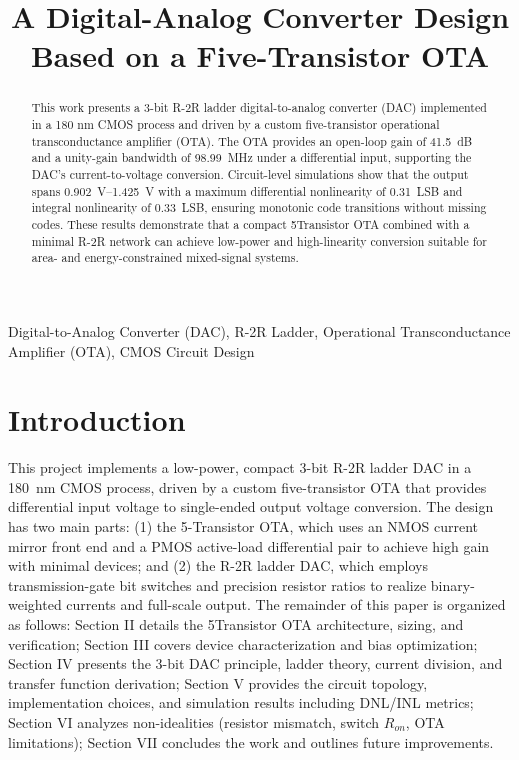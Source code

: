 \documentclass[conference]{IEEEtran}
\begin{document}
\title{A Digital-Analog Converter Design Based on a Five-Transistor OTA\\
}

\author{

}

\maketitle

\begin{abstract}
This work presents a 3-bit R-2R ladder digital-to-analog converter (DAC) implemented in a 180 nm CMOS process and driven by a custom five-transistor operational transconductance amplifier (OTA). 
The OTA provides an open-loop gain of \SI{41.5}{\deci\bel} and a unity-gain bandwidth of \SI{98.99}{\mega\hertz} under a differential input, supporting the DAC's current-to-voltage conversion. 
Circuit-level simulations show that the output spans \SIrange{0.902}{1.425}{\volt} with a maximum differential nonlinearity of \SI{0.31}{LSB} and integral nonlinearity of \SI{0.33}{LSB}, ensuring monotonic code transitions without missing codes. 
These results demonstrate that a compact 5Transistor OTA combined with a minimal R-2R network can achieve low-power and high-linearity conversion suitable for area- and energy-constrained mixed-signal systems.
\end{abstract}

\begin{IEEEkeywords}
Digital-to-Analog Converter (DAC), R-2R Ladder, Operational Transconductance Amplifier (OTA), CMOS Circuit Design
\end{IEEEkeywords}

\section{Introduction}
This project implements a low-power, compact 3-bit R-2R ladder DAC in a \SI{180}{\nano\meter} CMOS process, driven by a custom five-transistor OTA that provides differential input voltage to single-ended output voltage conversion. 
The design has two main parts: (1) the 5-Transistor OTA, which uses an NMOS current mirror front end and a PMOS active-load differential pair to achieve high gain with minimal devices; and (2) the R-2R ladder DAC, which employs transmission-gate bit switches and precision resistor ratios to realize binary-weighted currents and full-scale output. 
The remainder of this paper is organized as follows: Section II details the 5Transistor OTA architecture, sizing, and verification; Section III covers device characterization and bias optimization; Section IV presents the 3-bit DAC principle, ladder theory, current division, and transfer function derivation; 
Section V provides the circuit topology, implementation choices, and simulation results including DNL/INL metrics; Section VI analyzes non-idealities (resistor mismatch, switch $R_{on}$, OTA limitations); Section VII concludes the work and outlines future improvements.
\end{document}

